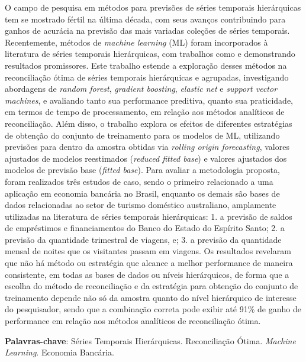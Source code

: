 

\setlength{\absparsep}{18pt}
\begin{resumo}
  O campo de pesquisa em métodos para previsões de séries temporais hierárquicas tem se mostrado fértil na última década, com seus avanços contribuindo para ganhos de acurácia na previsão das mais variadas coleções de séries temporais. Recentemente, métodos de \textit{machine learning} (ML) foram incorporados à literatura de séries temporais hierárquicas, com trabalhos como \textcite{spiliotis_hierarchical_2021} e \textcite{makridakis_m5_2022} demonstrando resultados promissores. Este trabalho estende a exploração desses métodos na reconciliação ótima de séries temporais hierárquicas e agrupadas, investigando abordagens de \textit{random forest}, \textit{gradient boosting}, \textit{elastic net} e \textit{support vector machines}, e avaliando tanto sua performance preditiva, quanto sua praticidade, em termos de tempo de processamento, em relação aos métodos analíticos de reconciliação. Além disso, o trabalho explora os efeitos de diferentes estratégias de obtenção do conjunto de treinamento para os modelos de ML, utilizando previsões para dentro da amostra obtidas via \textit{rolling origin forecasting}, valores ajustados de modelos reestimados (\textit{reduced fitted base}) e valores ajustados dos modelos de previsão base (\textit{fitted base}). Para avaliar a metodologia proposta, foram realizados três estudos de caso, sendo o primeiro relacionado a uma aplicação em economia bancária no Brasil, enquanto os demais são bases de dados relacionadas ao setor de turismo doméstico australiano, amplamente utilizadas na literatura de séries temporais hierárquicas: 1. a previsão de saldos de empréstimos e financiamentos do Banco do Estado do Espírito Santo; 2. a previsão da quantidade trimestral de viagens, e; 3. a previsão da quantidade mensal de noites que os visitantes passam em viagens. Os resultados revelaram que não há método ou estratégia que alcance a melhor performance de maneira consistente, em todas as bases de dados ou níveis hierárquicos, de forma que a escolha do método de reconciliação e da estratégia para obtenção do conjunto de treinamento depende não só da amostra quanto do nível hierárquico de interesse do pesquisador, sendo que a combinação correta pode exibir até 91\% de ganho de performance em relação aos métodos analíticos de reconciliação ótima.

  \textbf{Palavras-chave}: Séries Temporais Hierárquicas. Reconciliação Ótima. \textit{Machine Learning}. Economia Bancária.
\end{resumo}

